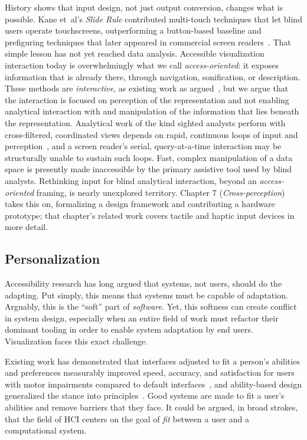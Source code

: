 \documentclass[12pt]{cmuthesis}
\newcommand{\ea}{{et~al\xperiod}\xspace}
\begin{document}
History shows that input design, not just output conversion, changes what is possible. Kane \ea's \textit{Slide Rule} contributed multi-touch techniques that let blind users operate touchscreens, outperforming a button-based baseline and prefiguring techniques that later appeared in commercial screen readers~\cite{Kane2008SlideRule}. That simple lesson has not yet reached data analysis. Accessible visualization interaction today is overwhelmingly what we call \textit{access-oriented}: it exposes information that is already there, through navigation, sonification, or description. These methods are \textit{interactive}, as existing work as argued~\cite{Zong2022Rich}, but we argue that the interaction is focused on perception of the representation and not enabling analytical interaction with and manipulation of the information that lies beneath the representation. Analytical work of the kind sighted analysts perform with cross-filtered, coordinated views depends on rapid, continuous loops of input and perception~\cite{Liu2014, heer_mosaic_2023}, and a screen reader's serial, query-at-a-time interaction may be structurally unable to sustain such loops. Fast, complex manipulation of a data space is presently made inaccessible by the primary assistive tool used by blind analysts. Rethinking input for blind analytical interaction, beyond an \textit{access-oriented} framing, is nearly unexplored territory. Chapter 7 (\textit{Cross-perception}) takes this on, formalizing a design framework and contributing a hardware prototype; that chapter's related work covers tactile and haptic input devices in more detail.
 
\subsection{Personalization}
 
Accessibility research has long argued that systems, not users, should do the adapting. Put simply, this means that systems must be capable of adaptation. Arguably, this is the ``soft'' part of \textit{software}. Yet, this softness can create conflict in system design, especially when an entire field of work must refactor their dominant tooling in order to enable system adaptation by end users. Visualization faces this exact challenge.

Existing work has demonstrated that interfaces adjusted to fit a person's abilities and preferences measurably improved speed, accuracy, and satisfaction for users with motor impairments compared to default interfaces~\cite{Gajos2010Supple}, and ability-based design generalized the stance into principles~\cite{Wobbrock2011Ability}. Good systems are made to fit a user's abilities and remove barriers that they face. It could be argued, in broad strokes, that the field of HCI centers on the goal of \textit{fit} between a user and a computational system.
\end{document}
